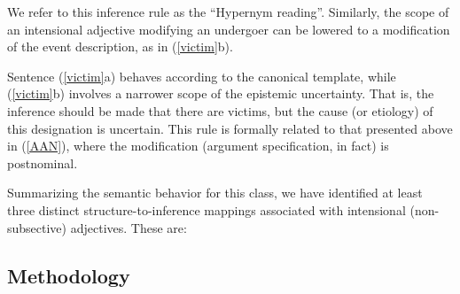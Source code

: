 \documentclass[10pt]{article}
\begin{document}
\noindent We refer to this inference rule as the ``Hypernym reading''. 
Similarly, the scope of an intensional adjective modifying an undergoer can be lowered to a modification of the event description, as  in (\ref{victim}b). 

\vspace{-0.5em}
\vspace{-0.5em}


\noindent Sentence  (\ref{victim}a) behaves according to the canonical template, while  (\ref{victim}b) involves a narrower scope of the epistemic uncertainty. That is, the inference should be made that there are victims, but the cause (or etiology) of this designation is uncertain. This rule is formally related to that presented above in (\ref{AAN}), where the modification (argument specification, in fact) is postnominal. 

\vspace{-0.5em}
\vspace{-0.5em}


\noindent Summarizing the semantic behavior for this class, we have identified at least three distinct structure-to-inference mappings associated with intensional (non-subsective) adjectives. These are:

\vspace{-0.5em}



\subsection{Methodology\label{prelim}}
\vspace {-3mm}
\end{document}
